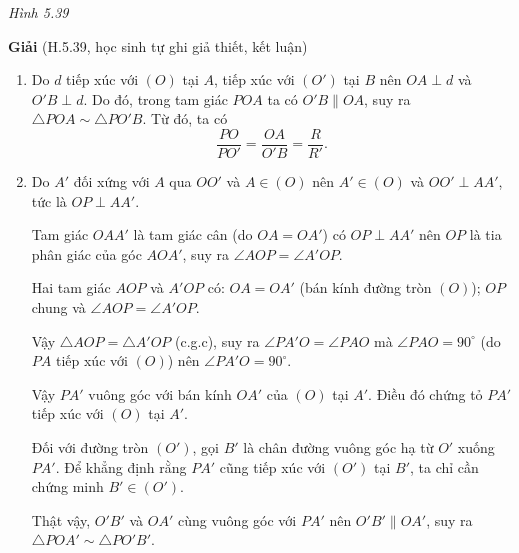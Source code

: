 \begin{exercises}
\begin{center}

        \textit{Hình 5.39}
    \end{center}

    \textbf{Giải} (H.5.39, học sinh tự ghi giả thiết, kết luận)

    \begin{enumerate}[label=\alph*)]
        \item Do $d$ tiếp xúc với $(O)$ tại $A$, tiếp xúc với $(O')$ tại $B$ nên $OA\perp d$ và $O'B\perp d$. Do đó, trong tam giác $POA$ ta có $O'B\parallel OA$, suy ra $\triangle POA\sim\triangle PO'B$. Từ đó, ta có
        \[
            \dfrac{PO}{PO'}=\dfrac{OA}{O'B}=\dfrac{R}{R'}.
        \]

        \item Do $A'$ đối xứng với $A$ qua $OO'$ và $A\in (O)$ nên $A'\in (O)$ và $OO'\perp AA'$, tức là $OP\perp AA'$.

        Tam giác $OAA'$ là tam giác cân (do $OA=OA'$) có $OP\perp AA'$ nên $OP$ là tia phân giác của góc $AOA'$, suy ra $\angle AOP=\angle A'OP$.

        Hai tam giác $AOP$ và $A'OP$ có: $OA=OA'$ (bán kính đường tròn $(O)$); $OP$ chung và $\angle AOP=\angle A'OP$.

        Vậy $\triangle AOP=\triangle A'OP$ (c.g.c), suy ra $\angle PA'O=\angle PAO$ mà $\angle PAO=90^\circ$ (do $PA$ tiếp xúc với $(O)$) nên $\angle PA'O=90^\circ$.

        Vậy $PA'$ vuông góc với bán kính $OA'$ của $(O)$ tại $A'$. Điều đó chứng tỏ $PA'$ tiếp xúc với $(O)$ tại $A'$.

        Đối với đường tròn $(O')$, gọi $B'$ là chân đường vuông góc hạ từ $O'$ xuống $PA'$. Để khẳng định rằng $PA'$ cũng tiếp xúc với $(O')$ tại $B'$, ta chỉ cần chứng minh $B'\in (O')$.

        Thật vậy, $O'B'$ và $OA'$ cùng vuông góc với $PA'$ nên $O'B'\parallel OA'$, suy ra $\triangle POA'\sim\triangle PO'B'$.


\end{enumerate}
\end{exercises}
